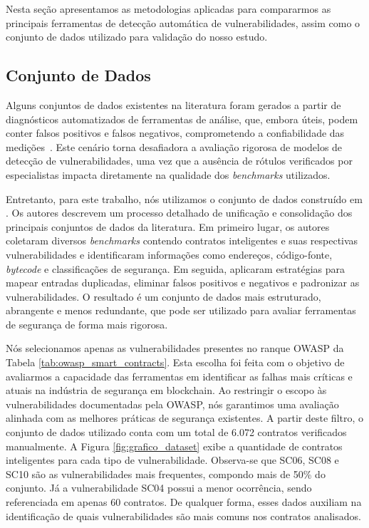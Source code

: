 \documentclass[12pt]{article}
\begin{document}
Nesta seção apresentamos as metodologias aplicadas para compararmos as principais ferramentas de detecção automática de vulnerabilidades, assim como o conjunto de dados utilizado para validação do nosso estudo.

\subsection{Conjunto de Dados}\label{subsec:dataset}

Alguns conjuntos de dados existentes na literatura foram gerados a partir de diagnósticos automatizados de ferramentas de análise, que, embora úteis, podem conter falsos positivos e falsos negativos, comprometendo a confiabilidade das medições~\cite{ressi2024vulnerability}. Este cenário torna desafiadora a avaliação rigorosa de modelos de detecção de vulnerabilidades, uma vez que a ausência de rótulos verificados por especialistas impacta diretamente na qualidade dos \textit{benchmarks} utilizados.

Entretanto, para este trabalho, nós utilizamos o conjunto de dados construído em \cite{di2023consolidation}. Os autores descrevem um processo detalhado de unificação e consolidação dos principais conjuntos de dados da literatura. Em primeiro lugar, os autores coletaram diversos \textit{benchmarks} contendo contratos inteligentes e suas respectivas vulnerabilidades e identificaram informações como endereços, código-fonte, \textit{bytecode} e classificações de segurança. Em seguida, aplicaram estratégias para mapear entradas duplicadas, eliminar falsos positivos e negativos e padronizar as vulnerabilidades. O resultado é um conjunto de dados mais estruturado, abrangente e menos redundante, que pode ser utilizado para avaliar ferramentas de segurança de forma mais rigorosa.

Nós selecionamos apenas as vulnerabilidades presentes no ranque OWASP da Tabela \ref{tab:owasp_smart_contracts}. Esta escolha foi feita com o objetivo de avaliarmos a capacidade das ferramentas em identificar as falhas mais críticas e atuais na indústria de segurança em blockchain. Ao restringir o escopo às vulnerabilidades documentadas pela OWASP, nós garantimos uma avaliação alinhada com as melhores práticas de segurança existentes. A partir deste filtro, o conjunto de dados utilizado conta com um total de 6.072 contratos verificados manualmente. A Figura \ref{fig:grafico_dataset} exibe a quantidade de contratos inteligentes para cada tipo de vulnerabilidade. Observa-se que SC06, SC08 e SC10 são as vulnerabilidades mais frequentes, compondo mais de 50\% do conjunto. Já a vulnerabilidade SC04 possui a menor ocorrência, sendo referenciada em apenas 60 contratos. De qualquer forma, esses dados auxiliam na identificação de quais vulnerabilidades são mais comuns nos contratos analisados.
\end{document}
